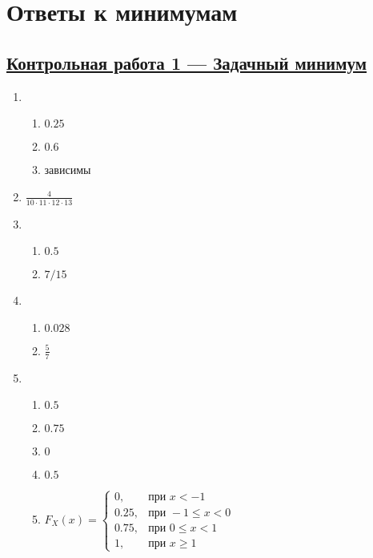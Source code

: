 \thispagestyle{empty}
\section{Ответы к минимумам}

\subsection[Кр 1]{\hyperref[sec:minimum_kr_01]{Контрольная работа 1 — Задачный минимум}}
\label{sec:sol_minimum_kr_01}



\begin{multicols}{2}
\begin{enumerate}
	\item %
	\begin{enumerate}
		\item $0.25$
		\item $0.6$
		\item зависимы
	\end{enumerate}
	\item %
	$\frac{4}{10 \cdot 11 \cdot 12 \cdot 13}$
	\item %
	\begin{enumerate}
		\item $0.5$
		\item $7/15$
	\end{enumerate}	
	\item %
	\begin{enumerate}
		\item $0.028$
		\item $\frac{5}{7}$
	\end{enumerate}	
	\item %
	\begin{enumerate}
		\item $0.5$
		\item $0.75$
		\item $0$
		\item $0.5$
		\item
		$F_{X}(x) = \begin{cases}
		0, & \text{при } x < -1 \\
		0.25 , & \text{при } -1 \le x < 0 \\
		0.75 , & \text{при } 0 \le x < 1 \\
		1, & \text{при }  x \geq 1
		\end{cases}$

\end{enumerate}
\end{enumerate}
\end{multicols}
